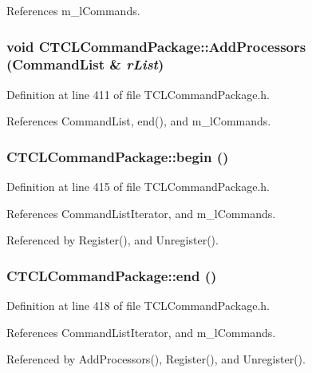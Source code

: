 References m\_\-l\-Commands.
\subsubsection{\setlength{\rightskip}{0pt plus 5cm}void CTCLCommand\-Package::Add\-Processors ({\bf Command\-List} \& {\em r\-List})\hspace{0.3cm}{\tt  [inline]}}\label{classCTCLCommandPackage_a11}




Definition at line 411 of file TCLCommand\-Package.h.

References Command\-List, end(), and m\_\-l\-Commands.
\subsubsection{ CTCLCommand\-Package::begin ()\hspace{0.3cm}{\tt  [inline]}}\label{classCTCLCommandPackage_a12}




Definition at line 415 of file TCLCommand\-Package.h.

References Command\-List\-Iterator, and m\_\-l\-Commands.

Referenced by Register(), and Unregister().
\subsubsection{ CTCLCommand\-Package::end ()\hspace{0.3cm}{\tt  [inline]}}\label{classCTCLCommandPackage_a13}




Definition at line 418 of file TCLCommand\-Package.h.

References Command\-List\-Iterator, and m\_\-l\-Commands.

Referenced by Add\-Processors(), Register(), and Unregister().

